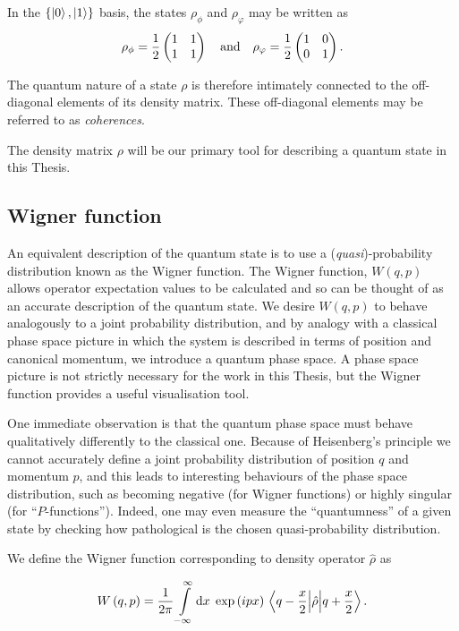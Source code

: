 In the $\left\{\ket{0}, \ket{1}\right\}$ basis, the states $\rho_\phi$ and $\rho_\varphi$ may be written as
\begin{equation}
\rho_\phi = \frac{1}{2}\pmqty{1 & 1 \\ 1 & 1} \qq{and} \rho_\varphi = \frac{1}{2}\pmqty{1 & 0 \\ 0  & 1}.
\end{equation}

\noindent The quantum nature of a state $\rho$ is therefore intimately connected to the off-diagonal elements of its density matrix. These off-diagonal elements may be referred to as \emph{coherences}. 

The density matrix $\rho$ will be our primary tool for describing a quantum state in this Thesis.


\FloatBarrier
\subsection{Wigner function}
An equivalent description of the quantum state is to use a (\emph{quasi})-probability distribution known as the Wigner function. The Wigner function, $W\left(q, p\right)$ allows operator expectation values to be calculated and so can be thought of as an accurate description of the quantum state. We desire $W\left(q, p\right)$ to behave analogously to a joint probability distribution, and by analogy with a classical phase space picture in which the system is described in terms of position and canonical momentum, we introduce a quantum phase space. A phase space picture is not strictly necessary for the work in this Thesis, but the Wigner function provides a useful visualisation tool.

One immediate observation is that the quantum phase space must behave qualitatively differently to the classical one. Because of Heisenberg's principle we cannot accurately define a joint probability distribution of position $q$ and momentum $p$, and this leads to interesting behaviours of the phase space distribution, such as becoming negative (for Wigner functions) or highly singular (for ``$P$-functions''). Indeed, one may even measure the ``quantumness'' of a given state by checking how pathological is the chosen quasi-probability distribution.

We define the Wigner function corresponding to density operator $\hat{\rho}$ as \cite{Leonhardt2010}

\begin{equation}\label{eqn:intro_wigners_formula}
W\left(q, p\right) = \frac{1}{2 \pi} \int\limits_{-\infty}^{\infty} \mathrm{d}x \; \exp\left(i p x\right) \mel{q - \frac{x}{2}}{\hat{\rho}}{q + \frac{x}{2}}.
\end{equation}


